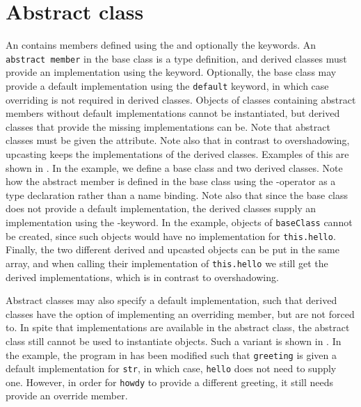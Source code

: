 \section{Abstract class}
\label{sec:abstract}
An  contains members defined using the  and optionally the  keywords. An \lstinline{abstract member} in the base class is a type definition, and derived classes must provide an implementation using the  keyword. Optionally, the base class may provide a default implementation using the \lstinline{default} keyword, in which case overriding is not required in derived classes. Objects of classes containing abstract members without default implementations cannot be instantiated, but derived classes that provide the missing implementations can be. Note that abstract classes must be given the  attribute. Note also that in contrast to overshadowing, upcasting keeps the implementations of the derived classes. Examples of this are shown in .
%
%
In the example, we define a base class and two derived classes. Note how the abstract member is defined in the base class using the \lexeme{:}-operator as a type declaration rather than a name binding. Note also that since the base class does not provide a default implementation, the derived classes supply an implementation using the -keyword. In the example, objects of \lstinline{baseClass} cannot be created, since such objects would have no implementation for \lstinline{this.hello}. Finally, the two different derived and upcasted objects can be put in the same array, and when calling their implementation of \lstinline{this.hello} we still get the derived implementations, which is in contrast to overshadowing.

Abstract classes may also specify a default implementation, such that derived classes have the option of implementing an overriding member, but are not forced to. In spite that implementations are available in the abstract class, the abstract class still cannot be used to instantiate objects. Such a variant is shown in .
%
%
%
In the example, the program in  has been modified such that \lstinline{greeting} is given a default implementation for \lstinline{str}, in which case, \lstinline{hello} does not need to supply one. However, in order for \lstinline{howdy} to provide a different greeting, it still needs provide an override member. 

